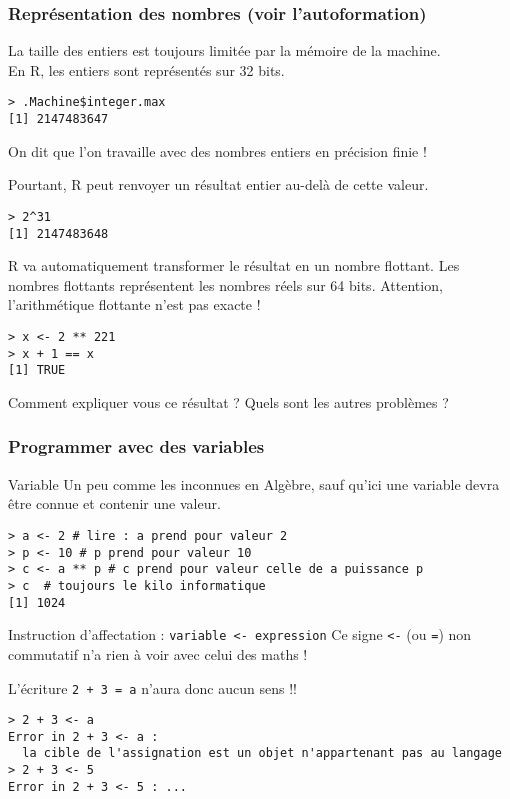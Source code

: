 \documentclass[10pt]{beamer}
\begin{document}
\begin{frame}[fragile]
  \frametitle{Représentation des nombres (voir l'autoformation)}
  \alert{La taille} des entiers \alert{est toujours limitée par} la mémoire de \alert{la machine}. \\
  En R, les entiers sont représentés sur 32 bits.
\begin{lstlisting}
> .Machine$integer.max
[1] 2147483647
\end{lstlisting}
On dit que l'on travaille avec des nombres entiers en \alert{précision finie} !

Pourtant, R peut renvoyer un résultat entier au-delà de cette valeur.
\begin{lstlisting}
> 2^31
[1] 2147483648
\end{lstlisting}
R va automatiquement transformer le résultat en un \alert{nombre flottant}.
Les nombres flottants représentent les nombres réels sur 64 bits.
Attention, l’arithmétique flottante n’est pas exacte !
\begin{lstlisting}
> x <- 2 ** 221
> x + 1 == x
[1] TRUE
\end{lstlisting}
 Comment expliquer vous ce résultat ? Quels sont les autres problèmes ?
\end{frame}



\begin{frame}[fragile]
  \frametitle{Programmer avec des variables}
  \begin{alertblock}{Variable}
    Un peu comme les \alert{inconnues} en Algèbre, sauf qu'ici une variable devra être \alert{connue} et contenir une valeur.
  \end{alertblock}
      \begin{lstlisting}
> a <- 2 # lire : a prend pour valeur 2
> p <- 10 # p prend pour valeur 10
> c <- a ** p # c prend pour valeur celle de a puissance p
> c  # toujours le kilo informatique
[1] 1024
\end{lstlisting}

\begin{alertblock}{Instruction d'affectation : \texttt{variable <- expression}}
  Ce signe \texttt{<-} (ou \texttt{=}) non commutatif n'a rien à voir avec celui des maths !
\end{alertblock}

\begin{exampleblock}{  L'écriture \texttt{2 + 3 = a} n'aura donc aucun sens !!}
\begin{lstlisting}[style=block]
> 2 + 3 <- a
Error in 2 + 3 <- a :
  la cible de l'assignation est un objet n'appartenant pas au langage
> 2 + 3 <- 5
Error in 2 + 3 <- 5 : ...
\end{lstlisting}
\end{exampleblock}
\end{frame}
\end{document}
